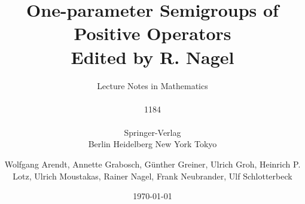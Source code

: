 \documentclass[graybox,envcountchap,sectrefs]{svmono}
\date{\today}
\begin{document}
\author{Wolfgang Arendt, Annette Grabosch, G\"unther Greiner, Ulrich Groh, Heinrich P. Lotz, Ulrich Moustakas, Rainer Nagel, Frank Neubrander, Ulf Schlotterbeck}
\title{One-parameter Semigroups of Positive Operators\\{\large{Edited by R. Nagel}}}
\subtitle{Lecture Notes in Mathematics\\ \\ 1184\\ \\Springer-Verlag\\ Berlin Heidelberg New York Tokyo}
\maketitle

\frontmatter%


%

%
%

\tableofcontents

%


\mainmatter%











%
%

\backmatter%
%
%

\end{document}
